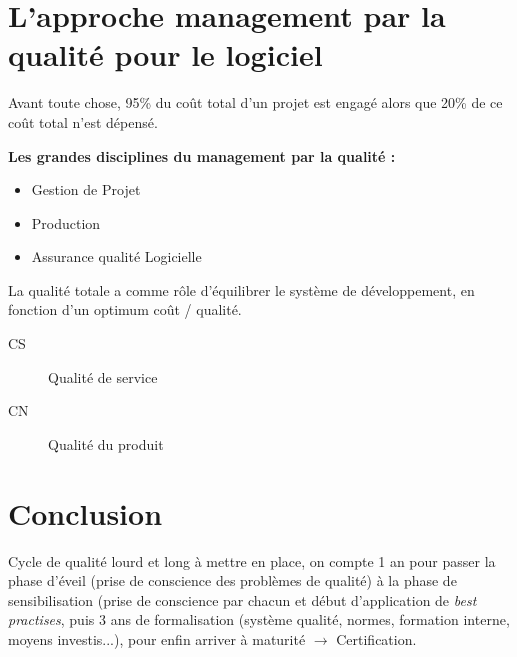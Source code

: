 \section{L’approche management par la qualité pour le logiciel}

Avant toute chose,  95\% du coût total d’un projet est engagé alors que 20\% de ce coût total n’est dépensé. %

\textbf{Les grandes disciplines du management par la qualité :}\hfill\\
\begin{itemize}
	\item Gestion de Projet
	\item Production
	\item Assurance qualité Logicielle
\end{itemize}

La qualité totale a comme rôle d’équilibrer le système de développement, en fonction d’un optimum coût / qualité.

\begin{description}
\item[CS] Qualité de service
\item[CN] Qualité du produit
\end{description}

\section{Conclusion}

Cycle de qualité lourd et long à mettre en place, on compte 1 an pour passer la phase d’éveil (prise de conscience des problèmes de qualité) à la phase de sensibilisation (prise de conscience par chacun et début d'application de \textsl{best practises}, puis 3 ans de formalisation (système qualité, normes, formation interne, moyens investis...), pour enfin arriver à maturité $\rightarrow$ Certification.

